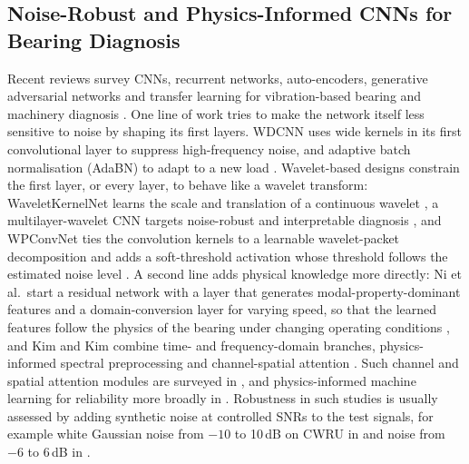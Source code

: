 \documentclass[conference]{IEEEtran}
\begin{document}
\subsection{Noise-Robust and Physics-Informed CNNs for Bearing Diagnosis}
Recent reviews survey CNNs, recurrent networks, auto-encoders, generative adversarial networks and transfer learning for vibration-based bearing and machinery diagnosis \cite{hakim2023review,tama2023review}. One line of work tries to make the network itself less sensitive to noise by shaping its first layers. WDCNN uses wide kernels in its first convolutional layer to suppress high-frequency noise, and adaptive batch normalisation (AdaBN) to adapt to a new load \cite{zhang2017wdcnn}. Wavelet-based designs constrain the first layer, or every layer, to behave like a wavelet transform: WaveletKernelNet learns the scale and translation of a continuous wavelet \cite{li2022wkn}, a multilayer-wavelet CNN targets noise-robust and interpretable diagnosis \cite{wang2023mwcnn}, and WPConvNet ties the convolution kernels to a learnable wavelet-packet decomposition and adds a soft-threshold activation whose threshold follows the estimated noise level \cite{li2024wpconvnet}. A second line adds physical knowledge more directly: Ni et al.\ start a residual network with a layer that generates modal-property-dominant features and a domain-conversion layer for varying speed, so that the learned features follow the physics of the bearing under changing operating conditions \cite{ni2023piresnet}, and Kim and Kim combine time- and frequency-domain branches, physics-informed spectral preprocessing and channel-spatial attention \cite{kim2023tfmd}. Such channel and spatial attention modules are surveyed in \cite{guo2022attention}, and physics-informed machine learning for reliability more broadly in \cite{xu2023piml}. Robustness in such studies is usually assessed by adding synthetic noise at controlled SNRs to the test signals, for example white Gaussian noise from $-10$ to 10\,dB on CWRU in \cite{hakim2022lightweight} and noise from $-6$ to 6\,dB in \cite{kim2023tfmd}.
\end{document}

